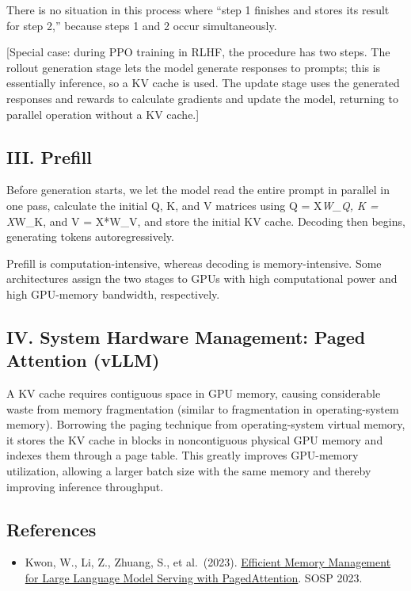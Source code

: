 There is no situation in this process where ``step 1 finishes and stores its result for step 2,'' because steps 1 and 2 occur simultaneously.

{[}Special case: during PPO training in RLHF, the procedure has two steps. The rollout generation stage lets the model generate responses to prompts; this is essentially inference, so a KV cache is used. The update stage uses the generated responses and rewards to calculate gradients and update the model, returning to parallel operation without a KV cache.{]}

\hypertarget{iii.-prefill}{%
\subsection{III. Prefill}\label{iii.-prefill}}

Before generation starts, we let the model read the entire prompt in parallel in one pass, calculate the initial Q, K, and V matrices using Q = X\emph{W\_Q, K = X}W\_K, and V = X*W\_V, and store the initial KV cache. Decoding then begins, generating tokens autoregressively.

Prefill is computation-intensive, whereas decoding is memory-intensive. Some architectures assign the two stages to GPUs with high computational power and high GPU-memory bandwidth, respectively.

\hypertarget{iv.-system-hardware-management-paged-attention-vllm}{%
\subsection{IV. System Hardware Management: Paged Attention (vLLM)}\label{iv.-system-hardware-management-paged-attention-vllm}}

A KV cache requires contiguous space in GPU memory, causing considerable waste from memory fragmentation (similar to fragmentation in operating-system memory). Borrowing the paging technique from operating-system virtual memory, it stores the KV cache in blocks in noncontiguous physical GPU memory and indexes them through a page table. This greatly improves GPU-memory utilization, allowing a larger batch size with the same memory and thereby improving inference throughput.

\FloatBarrier
{}
\hypertarget{references-91}{%
\subsection{References}\label{references-91}}

\vspace{0.25em}
\begin{itemize}
\tightlist
\item
  Kwon, W., Li, Z., Zhuang, S., et al.~(2023). \href{https://arxiv.org/abs/2309.06180}{Efficient Memory Management for Large Language Model Serving with PagedAttention}. SOSP 2023.
\end{itemize}

\clearpage
